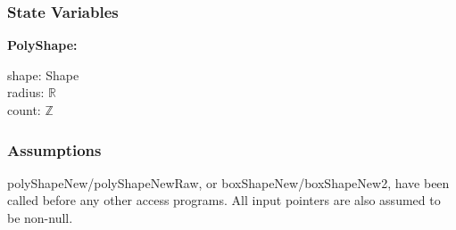 \documentclass[12pt]{article}
\newcommand{\R}{$\mathbb{R}$}
\newcommand{\Z}{$\mathbb{Z}$}
\begin{document}
\subsubsection{State Variables} \label{SecSVPoly}
	\noindent \textbf{PolyShape:}
	\begin{multicols}{2}
		\noindent shape: Shape \\
		radius: \R \\
		count: \Z \\
	\end{multicols}
	

\subsubsection{Assumptions} \label{SecAPoly}
 polyShapeNew/polyShapeNewRaw, or boxShapeNew/boxShapeNew2, have been called before any other access programs. All input pointers are also assumed to be non-null.
\end{document}
